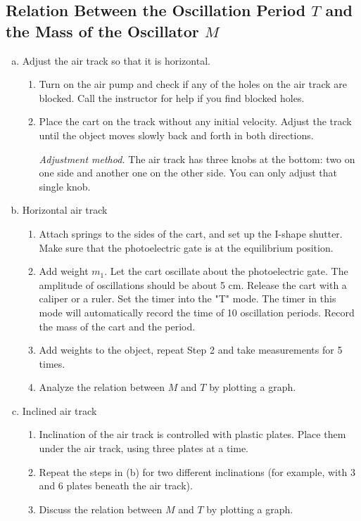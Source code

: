 \documentclass[12pt]{article}
\begin{document}
\subsection{Relation Between the Oscillation Period $T$ and the Mass of the Oscillator $M$}
\begin{enumerate}[(a)]
\item Adjust the air track so that it is horizontal.
\begin{enumerate}
\item Turn on the air pump and check if any of the holes on the air track are blocked.
Call the instructor for help if you find blocked holes.
\item Place the cart on the track without any initial velocity. Adjust the track until the object moves slowly back and forth in both directions.
\par \emph{Adjustment method.} The air track has three knobs at the bottom: two on one side
and another one on the other side. You can only adjust that single knob.
\end{enumerate}
\item Horizontal air track
\begin{enumerate}
\item Attach springs to the sides of the cart, and set up the I-shape shutter. Make sure
that the photoelectric gate is at the equilibrium position.
\item Add weight $m_1$. Let the cart oscillate about the photoelectric gate. The amplitude
of oscillations should be about 5 cm. Release the cart with a caliper or a ruler. Set
the timer into the "T" mode. The timer in this mode will automatically record
the time of 10 oscillation periods. Record the mass of the cart and the period.
\item Add weights to the object, repeat Step 2 and take measurements for 5 times.
\item Analyze the relation between $M$ and $T$ by plotting a graph.
\end{enumerate}
\item Inclined air track
\begin{enumerate}
\item Inclination of the air track is controlled with plastic plates. Place them under the
air track, using three plates at a time.
\item Repeat the steps in (b) for two different inclinations (for example, with 3 and 6 plates
beneath the air track).
\item Discuss the relation between $M$ and $T$ by plotting a graph.
\end{enumerate}
\end{enumerate}
\end{document}
